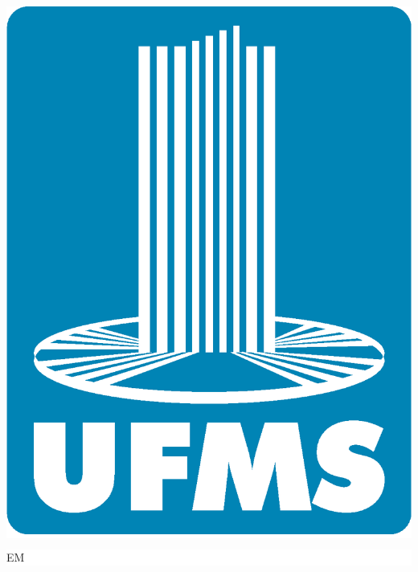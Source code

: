 \begin{center}
	\colorbox{white}{\begin{minipage}[t][3.1cm][t]{\textwidth}
			\begin{center}
				\centerline{\includegraphics[scale=.18]{figuras/logo-ufms.eps}}
			\end{center}
	\end{minipage}}
	
	\vskip 0.5cm
	
	\colorbox{white}{\begin{minipage}[t][1.6cm][t]{\textwidth}
			\begin{center}
				{\fontsize{14pt}{14pt}\selectfont \MakeUppercase{\instituicaoTRAB}} \break
				{\fontsize{12pt}{12pt}\selectfont \MakeUppercase{\campusInstituicaoTRAB}} \break
				{\fontsize{12pt}{12pt}\selectfont \MakeUppercase{{\grauCursoTRAB } em { \cursoTRAB}}}
			\end{center}
	\end{minipage}}
	

\end{center}
